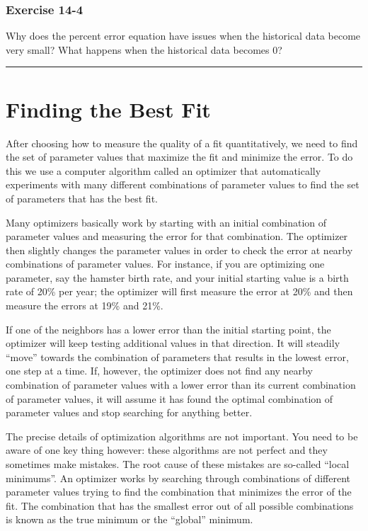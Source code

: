 \documentclass[]{memoir}
\begin{document}
\subsubsection{Exercise 14-4}

Why does the percent error equation have issues when the historical data
become very small? What happens when the historical data becomes 0?

\begin{center}\rule{3in}{0.4pt}\end{center}

\section{Finding the Best Fit}

After choosing how to measure the quality of a fit quantitatively, we
need to find the set of parameter values that maximize the fit and
minimize the error. To do this we use a computer algorithm called an
optimizer that automatically experiments with many different
combinations of parameter values to find the set of parameters that has
the best fit.

Many optimizers basically work by starting with an initial combination
of parameter values and measuring the error for that combination. The
optimizer then slightly changes the parameter values in order to check
the error at nearby combinations of parameter values. For instance, if
you are optimizing one parameter, say the hamster birth rate, and your
initial starting value is a birth rate of 20\% per year; the optimizer
will first measure the error at 20\% and then measure the errors at 19\%
and 21\%.

If one of the neighbors has a lower error than the initial starting
point, the optimizer will keep testing additional values in that
direction. It will steadily ``move'' towards the combination of
parameters that results in the lowest error, one step at a time. If,
however, the optimizer does not find any nearby combination of parameter
values with a lower error than its current combination of parameter
values, it will assume it has found the optimal combination of parameter
values and stop searching for anything better.

The precise details of optimization algorithms are not important. You
need to be aware of one key thing however: these algorithms are not
perfect and they sometimes make mistakes. The root cause of these
mistakes are so-called ``local minimums''. An optimizer works by
searching through combinations of different parameter values trying to
find the combination that minimizes the error of the fit. The
combination that has the smallest error out of all possible combinations
is known as the true minimum or the ``global'' minimum.
\end{document}
